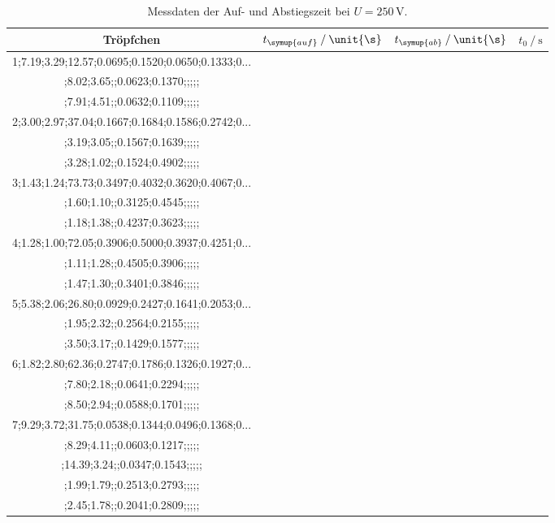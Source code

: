 \begin{table}
    \centering
    \caption{Messdaten der Auf- und Abstiegszeit bei $U=250\,\unit{\V}$.}
\begin{tabular}{c c c c}
    \toprule
        Tröpfchen &$t_{\symup{auf}} \mathbin{/} \unit{\s}$ & $t_{\symup{ab}}\mathbin{/} \unit{\s}$ & $t_0 \mathbin{/}\unit{\s}$ \\
    \midrule
    1;7.19;3.29;12.57;0.0695;0.1520;0.0650;0.1333;0... \\
    ;8.02;3.65;;0.0623;0.1370;;;;; \\
    ;7.91;4.51;;0.0632;0.1109;;;;; \\
2;3.00;2.97;37.04;0.1667;0.1684;0.1586;0.2742;0... \\
    ;3.19;3.05;;0.1567;0.1639;;;;; \\
    ;3.28;1.02;;0.1524;0.4902;;;;; \\
3;1.43;1.24;73.73;0.3497;0.4032;0.3620;0.4067;0... \\
    ;1.60;1.10;;0.3125;0.4545;;;;; \\
    ;1.18;1.38;;0.4237;0.3623;;;;; \\
4;1.28;1.00;72.05;0.3906;0.5000;0.3937;0.4251;0... \\
    ;1.11;1.28;;0.4505;0.3906;;;;; \\
    ;1.47;1.30;;0.3401;0.3846;;;;; \\
5;5.38;2.06;26.80;0.0929;0.2427;0.1641;0.2053;0... \\
    ;1.95;2.32;;0.2564;0.2155;;;;; \\
    ;3.50;3.17;;0.1429;0.1577;;;;; \\
6;1.82;2.80;62.36;0.2747;0.1786;0.1326;0.1927;0... \\
    ;7.80;2.18;;0.0641;0.2294;;;;; \\
    ;8.50;2.94;;0.0588;0.1701;;;;; \\
7;9.29;3.72;31.75;0.0538;0.1344;0.0496;0.1368;0... \\
    ;8.29;4.11;;0.0603;0.1217;;;;; \\
   ;14.39;3.24;;0.0347;0.1543;;;;; \\
    ;1.99;1.79;;0.2513;0.2793;;;;; \\
    ;2.45;1.78;;0.2041;0.2809;;;;; \\
    \bottomrule
    \end{tabular}
    \label{tab:250}
\end{table}